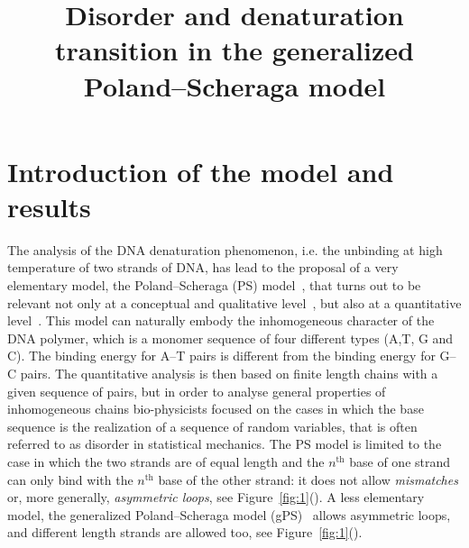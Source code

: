 \documentclass[AHL,Unicode,longabstracts]{cedram}
\title[The disordered generalized Poland--Scheraga model]
{Disorder and denaturation transition in the generalized Poland--Scheraga model}
\author[\initial{Q.} \lastname{Berger}]{\firstname{Quentin} \lastname{Berger}}
\author[\initial{G.} \lastname{Giacomin}]{\firstname{Giambattista} \lastname{Giacomin}}
\author[\initial{M.} \lastname{Khatib}]{\firstname{Maha} \lastname{Khatib}}
\DeclareMathOperator{\tHt}{th}
\newcommand*\eqsubref[1]{(\subref{#1})} %
\begin{document}
\maketitle



\section{Introduction of the model and results}

The analysis of the DNA denaturation phenomenon, i.e. the unbinding at high temperature of two strands of DNA, has lead to the proposal of a very elementary model, the Poland--Scheraga (PS) model~\cite{cf:PSbook}, that turns out to be relevant not only at a conceptual and qualitative level~\cite{cf:Fisher,cf:GB}, but also at a quantitative level~\cite{cf:Blake2,cf:Blake1}. This model can naturally embody the inhomogeneous character of the DNA polymer, which is a monomer sequence of four different types (A,T, G and C). The binding energy for A--T pairs is different from the binding energy for G--C pairs. The quantitative analysis is then based on finite length chains with a given sequence of pairs, but in order to analyse general properties of inhomogeneous chains bio-physicists focused on the cases in which the base sequence is the realization of a sequence of random variables, that is often referred to as disorder in statistical mechanics. The PS model is limited to the case in which the two strands are of equal length and the $n^{\tHt}$ base of one strand can only bind with the $n^{\tHt}$ base of the other strand: it does not allow \emph{mismatches} or, more generally, \emph{asymmetric loops}, see Figure~\ref{fig:1}\eqsubref{fig:PS}. A less elementary model, the generalized Poland--Scheraga model (gPS)~\cite{cf:GK} allows asymmetric loops, and different length strands are allowed too, see Figure~\ref{fig:1}\eqsubref{fig:gPS}.

\end{document}
